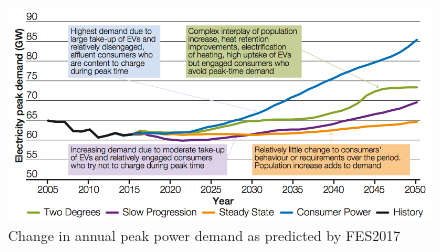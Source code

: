 \begin{figure}\centering
	\includegraphics{_introduction/fig/electricity-peak-demand}
	\caption{Change in annual peak power demand as predicted by FES2017 \cite{FES2017}}
	\label{ch-introduction:fig:electricity-peak-demand}
\end{figure}